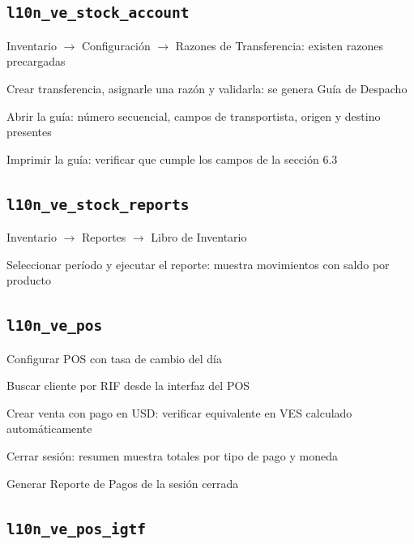 \documentclass[11pt,a4paper]{article}
\newcommand{\modulo}[1]{\texttt{\textcolor{naranja}{#1}}}
\begin{document}
\begin{Form}
\subsection{\modulo{l10n\_ve\_stock\_account}}

\begin{checklist}
  \item Inventario $\rightarrow$ Configuración $\rightarrow$ Razones de Transferencia: existen razones precargadas
  \item Crear transferencia, asignarle una razón y validarla: se genera Guía de Despacho
  \item Abrir la guía: número secuencial, campos de transportista, origen y destino presentes
  \item Imprimir la guía: verificar que cumple los campos de la sección 6.3
\end{checklist}

\subsection{\modulo{l10n\_ve\_stock\_reports}}

\begin{checklist}
  \item Inventario $\rightarrow$ Reportes $\rightarrow$ Libro de Inventario
  \item Seleccionar período y ejecutar el reporte: muestra movimientos con saldo por producto
\end{checklist}

\subsection{\modulo{l10n\_ve\_pos}}

\begin{checklist}
  \item Configurar POS con tasa de cambio del día
  \item Buscar cliente por RIF desde la interfaz del POS
  \item Crear venta con pago en USD: verificar equivalente en VES calculado automáticamente
  \item Cerrar sesión: resumen muestra totales por tipo de pago y moneda
  \item Generar Reporte de Pagos de la sesión cerrada
\end{checklist}

\subsection{\modulo{l10n\_ve\_pos\_igtf}}


\end{Form}
\end{document}
